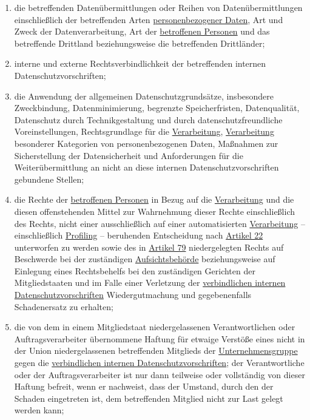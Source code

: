 \begin{enumerate}
\begin{enumerate}
    \item die betreffenden Datenübermittlungen oder Reihen von Datenübermittlungen einschließlich der betreffenden Arten
     \hyperref[itm:04-1]{personenbezogener Daten}, Art und Zweck der Datenverarbeitung, Art der \hyperref[itm:04-1]{betroffenen Personen} und das betreffende
     Drittland beziehungsweise die betreffenden Drittländer;
    \label{itm:47-2b}

    \item interne und externe Rechtsverbindlichkeit der betreffenden internen Datenschutzvorschriften;
    \label{itm:47-2c}

    \item die Anwendung der allgemeinen Datenschutzgrundsätze, insbesondere Zweckbindung, Datenminimierung, begrenzte
     Speicherfristen, Datenqualität, Datenschutz durch Technikgestaltung und durch datenschutzfreundliche
     Voreinstellungen, Rechtsgrundlage für die \hyperref[itm:04-2]{Verarbeitung}, \hyperref[itm:04-2]{Verarbeitung} besonderer Kategorien von personenbezogenen
     Daten, Maßnahmen zur Sicherstellung der Datensicherheit und Anforderungen für die Weiterübermittlung an nicht an
     diese internen Datenschutzvorschriften gebundene Stellen;
    \label{itm:47-2d}

    \item die Rechte der \hyperref[itm:04-1]{betroffenen Personen} in Bezug auf die \hyperref[itm:04-2]{Verarbeitung} und die diesen offenstehenden Mittel zur
     Wahrnehmung dieser Rechte einschließlich des Rechts, nicht einer ausschließlich auf einer automatisierten
     \hyperref[itm:04-2]{Verarbeitung} -- einschließlich \hyperref[itm:04-4]{Profiling} -- beruhenden Entscheidung nach \hyperref[ch:22]{Artikel 22} unterworfen
     zu werden sowie des in \hyperref[ch:79]{Artikel 79} niedergelegten Rechts auf Beschwerde bei der zuständigen
     \hyperref[itm:04-21]{Aufsichtsbehörde} beziehungsweise auf Einlegung eines Rechtsbehelfs bei den zuständigen Gerichten der
     Mitgliedstaaten und im Falle einer Verletzung der \hyperref[itm:04-20]{verbindlichen internen Datenschutzvorschriften} Wiedergutmachung
     und gegebenenfalls Schadenersatz zu erhalten;
    \label{itm:47-2e}

    \item die von dem in einem Mitgliedstaat niedergelassenen Verantwortlichen oder Auftragsverarbeiter übernommene
     Haftung für etwaige Verstöße eines nicht in der Union niedergelassenen betreffenden Mitglieds der
     \hyperref[itm:04-19]{Unternehmensgruppe} gegen die \hyperref[itm:04-20]{verbindlichen internen Datenschutzvorschriften}; der Verantwortliche oder der
     Auftragsverarbeiter ist nur dann teilweise oder vollständig von dieser Haftung befreit, wenn er nachweist, dass
     der Umstand, durch den der Schaden eingetreten ist, dem betreffenden Mitglied nicht zur Last gelegt werden kann;
    \label{itm:47-2f}


\end{enumerate}
\end{enumerate}

